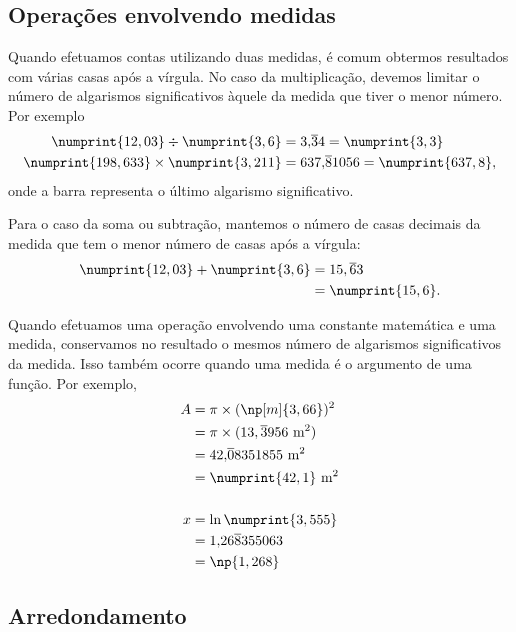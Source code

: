 \subsection{Operações envolvendo medidas}

Quando efetuamos contas utilizando duas medidas, é comum obtermos resultados com várias casas após a vírgula. No caso da multiplicação, devemos limitar o número de algarismos significativos àquele da medida que tiver o menor número. Por exemplo
\begin{subequations}\label{Eq:AlgarismosSignificativos}
\begin{align}
     \numprint{12,03} \div \numprint{3,6} &= 3{,}\overline{3}4 = \numprint{3,3} \\
     \numprint{198,633} \times \numprint{3,211} &= 637{,}\overline{8}1056 = \numprint{637,8},
\end{align}
\end{subequations}
%
onde a barra representa o último algarismo significativo.

Para o caso da soma ou subtração, mantemos o número de casas decimais da medida que tem o menor número de casas após a vírgula:
\begin{align}
	 \numprint{12,03} + \numprint{3,6} &= 15,\overline{6}3\\
		 &= \numprint{15,6}.
\end{align}

Quando efetuamos uma operação envolvendo uma constante matemática e uma medida, conservamos no resultado o mesmos número de algarismos significativos da medida. Isso também ocorre quando uma medida é o argumento de uma função. Por exemplo,
\begin{align}
	A &= \pi \times (\np[m]{3,66})^2 \\
	  &= \pi \times (13,\overline{3}956~\textrm{m}^2)\\
	  &= 42{,}\overline{0}8351855~\textrm{m}^2 \\
	  &= \numprint{42,1}~\textrm{m}^2 \\
	  \nonumber \\
	x &= \ln \numprint{3,555} \\
	&= 1{,}26\overline{8}355063 \\
	&= \np{1,268}
\end{align}

\subsection{Arredondamento}

